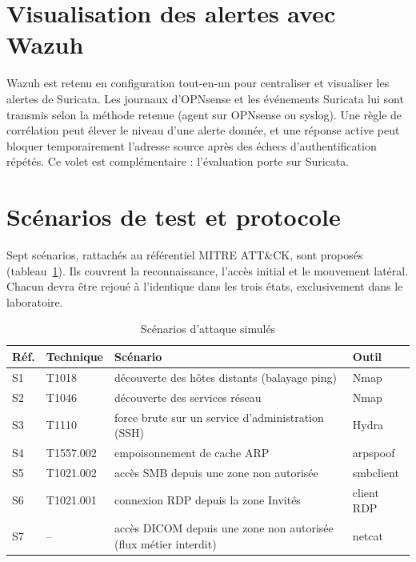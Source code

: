 
\section{Visualisation des alertes avec Wazuh}

Wazuh est retenu en configuration tout-en-un pour centraliser et visualiser les alertes de Suricata\cite{wazuhdoc}. Les journaux d'OPNsense et les événements Suricata lui sont transmis selon la méthode retenue (agent sur OPNsense ou syslog). Une règle de corrélation peut élever le niveau d'une alerte donnée, et une réponse active peut bloquer temporairement l'adresse source après des échecs d'authentification répétés. Ce volet est complémentaire : l'évaluation porte sur Suricata.


\section{Scénarios de test et protocole}

Sept scénarios, rattachés au référentiel MITRE ATT\&CK\cite{attck}, sont proposés (tableau~\ref{tab:scenarios}). Ils couvrent la reconnaissance, l'accès initial et le mouvement latéral. Chacun devra être rejoué à l'identique dans les trois états, exclusivement dans le laboratoire.

\begin{table}[htbp]
\centering
\small
\begin{tabularx}{\textwidth}{llXl}
\hline
\textbf{Réf.} & \textbf{Technique} & \textbf{Scénario} & \textbf{Outil} \\
\hline
S1 & T1018 & découverte des hôtes distants (balayage ping) & Nmap \\
S2 & T1046 & découverte des services réseau & Nmap \\
S3 & T1110 & force brute sur un service d'administration (SSH) & Hydra \\
S4 & T1557.002 & empoisonnement de cache ARP & arpspoof \\
S5 & T1021.002 & accès SMB depuis une zone non autorisée & smbclient \\
S6 & T1021.001 & connexion RDP depuis la zone Invités & client RDP \\
S7 & -- & accès DICOM depuis une zone non autorisée (flux métier interdit) & netcat \\
\hline
\end{tabularx}
\caption{Scénarios d'attaque simulés}
\label{tab:scenarios}
\end{table}


